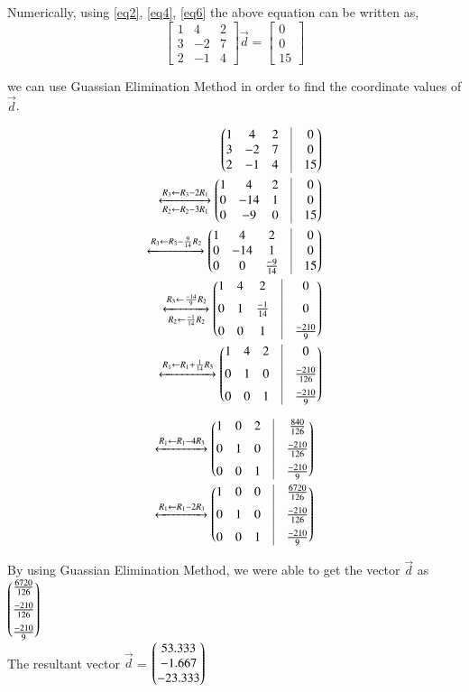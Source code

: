 \documentclass[journal,12pt,twocolumn]{IEEEtran}
\begin{document}
     
Numerically, using \ref{eq2}, \ref{eq4}, \ref{eq6} the above equation can be written as,
\[\begin{bmatrix}
    	1 & 4 & 2 \\
    	3 & -2 & 7 \\
    	2 & -1 & 4 
    \end{bmatrix}
    \vec{d}
    =
    \begin{bmatrix}
    	0 \\ 0 \\ 15
    \end{bmatrix}
    \]
     
    
    we can use Guassian Elimination Method in order to find the coordinate values of $\vec{d}$.
    
    

	\begin{align}
		\myvec{
			1 & 4 & 2 & \vrule & 0 \\
			3 & -2 & 7 & \vrule & 0 \\
			2 & -1 & 4 & \vrule & 15 \\
		}
		\\
		\xleftrightarrow[R_2 \leftarrow R_2-3R_1]{R_3 \leftarrow R_3 - 2R_1}
		\myvec{
			1 & 4 & 2 & \vrule & 0 \\
			0 & -14 & 1 & \vrule & 0 \\
			0 & -9 & 0 & \vrule & 15
		}
		\\
		\xleftrightarrow[]{R_3\leftarrow R_3-\frac{9}{14}R_2}
		\myvec{
			1 & 4 & 2 & \vrule & 0 \\
			0 & -14 & 1 & \vrule & 0 \\
			0 & 0 & \frac{-9}{14} & \vrule & 15
		}\\
		\xleftrightarrow[R_2 \leftarrow \frac{-1}{14}R_2]{R_3 \leftarrow \frac{-14}{9}R_2}
		\myvec{
			1 & 4 & 2 & \vrule & 0 \\[0.2cm]
			0 & 1 & \frac{-1}{14} & \vrule & 0 \\[0.2cm]
			0 & 0 & 1 & \vrule & \frac{-210}{9}
		}\\
		\xleftrightarrow[]{R_1 \leftarrow R_1+\frac{1}{14}R_3}
		\myvec{
			1 & 4 & 2 & \vrule & 0 \\[0.2cm]
			0 & 1 & 0 & \vrule & \frac{-210}{126} \\[0.2cm]
			0 & 0 & 1 & \vrule & \frac{-210}{9}
		}
	\end{align}


	\begin{align}
		\xleftrightarrow[]{R_1 \leftarrow R_1-4R_3}
		\myvec{
			1 & 0 & 2 & \vrule & \frac{840}{126} \\[0.2cm]
			0 & 1 & 0 & \vrule & \frac{-210}{126} \\[0.2cm]
			0 & 0 & 1 & \vrule & \frac{-210}{9}
		}\\
		\xleftrightarrow[]{R_1 \leftarrow R_1-2R_3}
		\myvec{
			1 & 0 & 0 & \vrule & \frac{6720}{126} \\[0.2cm]
			0 & 1 & 0 & \vrule & \frac{-210}{126} \\[0.2cm]
			0 & 0 & 1 & \vrule & \frac{-210}{9}
		}
\end{align}


By using Guassian Elimination Method, we were able to get the vector $\vec{d}$ as
	$\begin{pmatrix}\frac{6720}{126} \\[0.2cm]\frac{-210}{126} \\[0.2cm]\frac{-210}{9}\end{pmatrix}$\\[0.5cm]
	
The resultant vector $\vec{d}$ = $\begin{pmatrix}53.333\\-1.667\\-23.333\end{pmatrix}$
    
\end{document}
